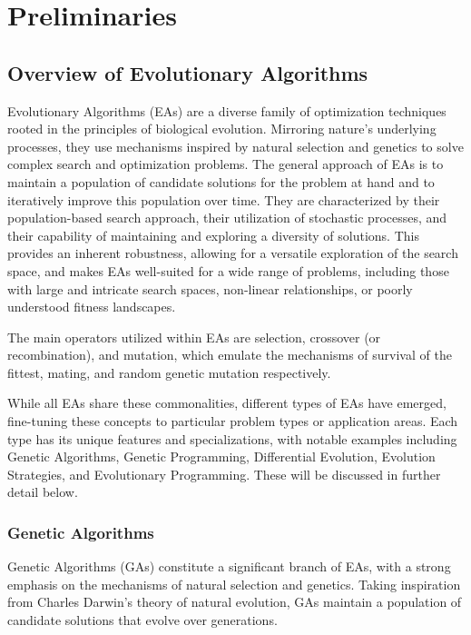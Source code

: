 \documentclass[twoside]{ctuthesis}
\theoremstyle{plain}
\theoremstyle{definition}
\theoremstyle{note}
\begin{document}
\chapter{Preliminaries}


\section{Overview of Evolutionary Algorithms}

Evolutionary Algorithms (EAs) are a diverse family of optimization techniques rooted in the principles of biological evolution. Mirroring nature's underlying processes, they use mechanisms inspired by natural selection and genetics to solve complex search and optimization problems. The general approach of EAs is to maintain a population of candidate solutions for the problem at hand and to iteratively improve this population over time. They are characterized by their population-based search approach, their utilization of stochastic processes, and their capability of maintaining and exploring a diversity of solutions. This provides an inherent robustness, allowing for a versatile exploration of the search space, and makes EAs well-suited for a wide range of problems, including those with large and intricate search spaces, non-linear relationships, or poorly understood fitness landscapes.

The main operators utilized within EAs are selection, crossover (or recombination), and mutation, which emulate the mechanisms of survival of the fittest, mating, and random genetic mutation respectively.

While all EAs share these commonalities, different types of EAs have emerged, fine-tuning these concepts to particular problem types or application areas. Each type has its unique features and specializations, with notable examples including Genetic Algorithms, Genetic Programming, Differential Evolution, Evolution Strategies, and Evolutionary Programming. These will be discussed in further detail below.


\subsection{Genetic Algorithms}

Genetic Algorithms (GAs) constitute a significant branch of EAs, with a strong emphasis on the mechanisms of natural selection and genetics. Taking inspiration from Charles Darwin's theory of natural evolution, GAs maintain a population of candidate solutions that evolve over generations.
\end{document}
